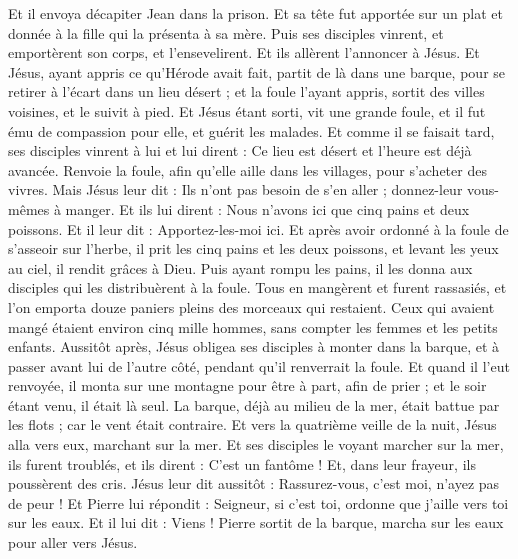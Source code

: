 \begin{multicols}{2}
Et il envoya décapiter Jean dans la prison.
Et sa tête fut apportée sur un plat et donnée à la fille qui la présenta à sa mère.
Puis ses disciples vinrent, et emportèrent son corps, et l'ensevelirent. Et ils allèrent l’annoncer à Jésus.
Et Jésus, ayant appris ce qu’Hérode avait fait, partit de là dans une barque, pour se retirer à l’écart dans un lieu désert ; et la foule l’ayant appris, sortit des villes voisines, et le suivit à pied.
Et Jésus étant sorti, vit une grande foule, et il fut ému de compassion pour elle, et guérit les malades.
Et comme il se faisait tard, ses disciples vinrent à lui et lui dirent : Ce lieu est désert et l'heure est déjà avancée. Renvoie la foule, afin qu'elle aille dans les villages, pour s’acheter des vivres.
Mais Jésus leur dit : Ils n'ont pas besoin de s'en aller ; donnez-leur vous-mêmes à manger.
Et ils lui dirent : Nous n'avons ici que cinq pains et deux poissons.
Et il leur dit : Apportez-les-moi ici.
Et après avoir ordonné à la foule de s'asseoir sur l'herbe, il prit les cinq pains et les deux poissons, et levant les yeux au ciel, il rendit grâces à Dieu. Puis ayant rompu les pains, il les donna aux disciples qui les distribuèrent à la foule.
Tous en mangèrent et furent rassasiés, et l’on emporta douze paniers pleins des morceaux qui restaient.
Ceux qui avaient mangé étaient environ cinq mille hommes, sans compter les femmes et les petits enfants.
Aussitôt après, Jésus obligea ses disciples à monter dans la barque, et à passer avant lui de l'autre côté, pendant qu'il renverrait la foule.
Et quand il l’eut renvoyée, il monta sur une montagne pour être à part, afin de prier ; et le soir étant venu, il était là seul.
La barque, déjà au milieu de la mer, était battue par les flots ; car le vent était contraire.
Et vers la quatrième veille de la nuit, Jésus alla vers eux, marchant sur la mer.
Et ses disciples le voyant marcher sur la mer, ils furent troublés, et ils dirent : C’est un fantôme ! Et, dans leur frayeur, ils poussèrent des cris.
Jésus leur dit aussitôt : Rassurez-vous, c'est moi, n'ayez pas de peur !
Et Pierre lui répondit : Seigneur, si c'est toi, ordonne que j'aille vers toi sur les eaux.
Et il lui dit : Viens ! Pierre sortit de la barque, marcha sur les eaux pour aller vers Jésus.

\end{multicols}
